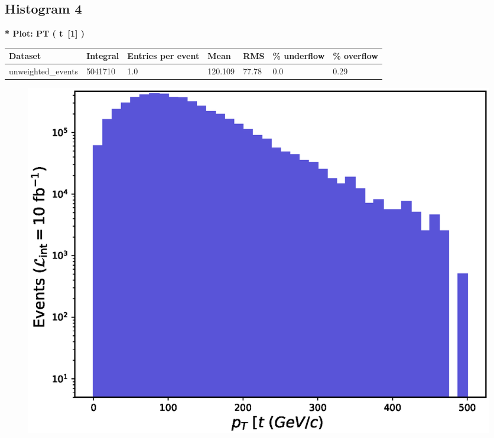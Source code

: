 \documentclass[a4paper, 10pt]{article}
\begin{document}
\subsection{ Histogram 4}

\textbf{* Plot: PT ( t~[1] ) }\\
   \begin{table}[H]
  \begin{center}
    \begin{tabular}{|m{23.0mm}|m{23.0mm}|m{18.0mm}|m{19.0mm}|m{19.0mm}|m{19.0mm}|m{19.0mm}|}
      \hline
      {\cellcolor{yellow}         Dataset}& {\cellcolor{yellow}         Integral}& {\cellcolor{yellow}         Entries per event}& {\cellcolor{yellow}         Mean}& {\cellcolor{yellow}         RMS}& {\cellcolor{yellow}         \% underflow}& {\cellcolor{yellow}         \% overflow}\\
      \hline
      {\cellcolor{white}         unweighted\_events}& {\cellcolor{white}         5041710}& {\cellcolor{white}         1.0}& {\cellcolor{white}         120.109}& {\cellcolor{white}         77.78}& {\cellcolor{green}         0.0}& {\cellcolor{green}         0.29}\\
\hline
    \end{tabular}
  \end{center}
\end{table}

\begin{figure}[H]
  \begin{center}
    \includegraphics[scale=0.45]{selection_3.eps}\\
\caption{   }
  \end{center}
\end{figure}
      \newpage
\end{document}
